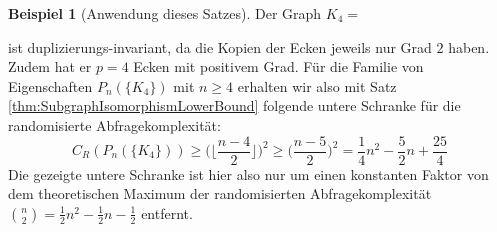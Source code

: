 \documentclass[a4paper]{scrreprt}
\theoremstyle{definition}
\newtheorem{example}{Beispiel}
\begin{document}
\begin{example}[Anwendung dieses Satzes]
Der Graph $K_4 =$
 ist duplizierungs-invariant, da die Kopien
der Ecken jeweils nur Grad $2$ haben. Zudem
hat er $p=4$ Ecken mit positivem Grad. Für die Familie von
Eigenschaften $P_n(\{K_4\})$ mit $ n\geq 4$ erhalten wir also
mit Satz \ref{thm:SubgraphIsomorphismLowerBound} folgende
untere Schranke für die randomisierte Abfragekomplexität:
$$ C_R(P_n(\{K_4\})) \geq 
\Big ( \Big \lfloor  \frac{n-4}{2} \Big \rfloor \Big ) ^2 \geq
\Big ( \frac{n-5}{2} \Big ) ^2 = 
\frac{1}{4} n^2 - \frac{5}{2} n + \frac{25}{4} 
$$
Die gezeigte untere Schranke ist hier also nur um einen
konstanten Faktor von dem theoretischen Maximum
der randomisierten Abfragekomplexität
$\binom{n}{2} = \frac{1}{2}n^2 - \frac{1}{2}n - \frac{1}{2}$
entfernt.
\end{example}
\end{document}
